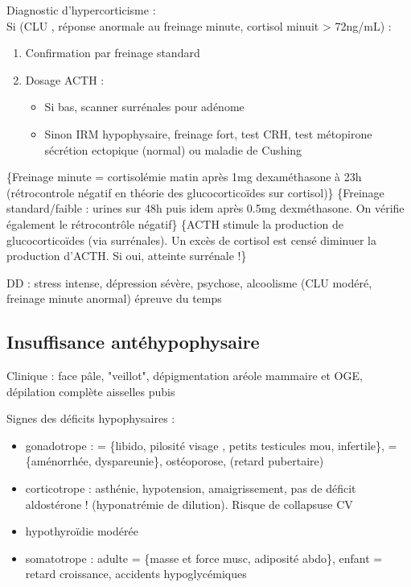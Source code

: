 \documentclass[11pt]{article}
\begin{document}
\begin{tcolorbox}
Diagnostic d'hypercorticisme :\\
  Si (\acrshort{CLU} \inc, réponse anormale au freinage minute\footnotemark, cortisol minuit > 72ng/mL) :
\begin{enumerate}
  \item Confirmation par freinage standard\footnotemark
  \item Dosage ACTH : 
  \begin{itemize}
    \item Si bas, scanner surrénales pour adénome\footnotemark
    \item Sinon IRM hypophysaire, freinage fort, test CRH, 
    test métopirone \thus sécrétion ectopique (normal) ou maladie de Cushing
    \end{itemize}
\end{enumerate}
\end{tcolorbox}

\footnotetext\{Freinage minute = cortisolémie matin après 1mg dexaméthasone à 23h
  (rétrocontrole négatif en théorie des glucocorticoïdes sur cortisol)\}
\footnotetext\{Freinage standard/faible : urines sur 48h puis idem après 0.5mg
  dexméthasone. On vérifie également le rétrocontrôle négatif\}
\footnotetext\{ACTH stimule la production de glucocorticoïdes (via
  surrénales). Un excès de cortisol est censé diminuer la production d'ACTH. Si
  oui, atteinte surrénale !\}

DD : stress intense, dépression sévère, psychose, alcoolisme (CLU modéré,
  freinage minute anormal) \thus épreuve du temps 

\subsection{Insuffisance antéhypophysaire}
\label{sec:org0eff979}
Clinique : face pâle, "veillot", dépigmentation aréole mammaire et OGE,
dépilation complète aisselles pubis

Signes des déficits hypophysaires :
\begin{itemize}
\item gonadotrope : \male = \{\dec libido, pilosité visage \dec, petits
testicules mou, infertile\}, \female = \{aménorrhée, dyspareunie\}, ostéoporose,
(retard pubertaire)
\item corticotrope : asthénie, hypotension, amaigrissement, pas de déficit
aldostérone ! (hyponatrémie de dilution). Risque de collapsuse CV
\item hypothyroïdie modérée
\item somatotrope : adulte = \{\dec masse et force musc, adiposité abdo\}, enfant =
retard croissance, accidents hypoglycémiques
\end{itemize}
\end{document}
